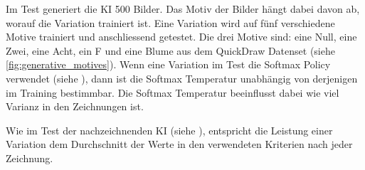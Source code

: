 Im Test generiert die KI 500 Bilder. Das Motiv der Bilder hängt dabei davon ab,
worauf die Variation trainiert ist. Eine Variation wird auf fünf verschiedene
Motive trainiert und anschliessend getestet. Die drei Motive sind: eine Null,
eine Zwei, eine Acht, ein F und eine Blume aus dem QuickDraw Datenset (siehe
\autoref{fig:generative_motives}). Wenn eine Variation im Test die Softmax
Policy verwendet (siehe ), dann ist die Softmax
Temperatur unabhängig von derjenigen im Training bestimmbar. Die Softmax
Temperatur beeinflusst dabei wie viel Varianz in den Zeichnungen ist.


Wie im Test der nachzeichnenden KI (siehe ),
entspricht die Leistung einer Variation dem Durchschnitt der Werte in den
verwendeten Kriterien nach jeder Zeichnung.

